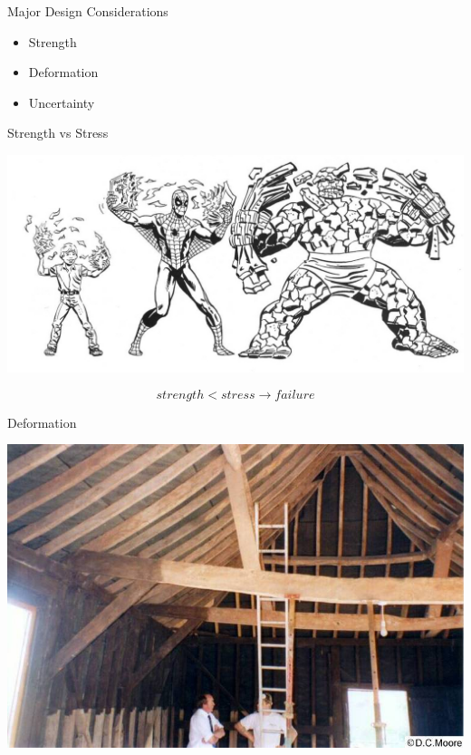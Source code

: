 \documentclass[10pt, svgnames]{beamer}
\begin{document}
\begin{frame}[label={sec:org75ab8f1}]{Major Design Considerations}
\begin{itemize}
\item Strength
\item Deformation
\item Uncertainty
\end{itemize}
\end{frame}


\begin{frame}[label={sec:org878b34d}]{Strength vs Stress}
\begin{center}
  \includegraphics[width=.9\linewidth]{./pictures/strength-stress.jpg}
\end{center}
\begin{equation*}
  strength < stress \rightarrow failure
\end{equation*}
\end{frame}

\begin{frame}[label={sec:org884c0f9}]{Deformation}
\begin{center}
  \includegraphics[width=.9\linewidth]{./pictures/deformed-beam.jpg}
\end{center}
\end{frame}
\end{document}
